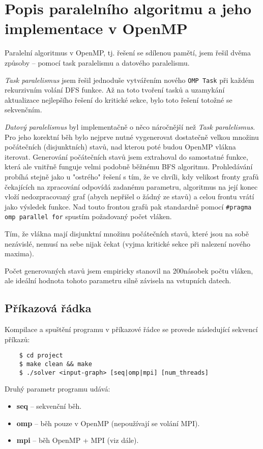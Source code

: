 \documentclass[czech]{article}
\begin{document}
\section{Popis paralelního algoritmu a jeho implementace v OpenMP}

Paralelní algoritmus v OpenMP, tj. řešení se sdílenou pamětí, jsem řešil dvěma způsoby -- pomocí task paralelismu a datového paralelismu.

\textit{Task paralelismus} jsem řešil jednoduše vytvářením nového \texttt{OMP Task} při každém rekurzivním volání DFS funkce. Až na toto tvoření tasků a uzamykání aktualizace nejlepšího řešení do kritické sekce, bylo toto řešení totožné se sekvenčním.

\textit{Datový paralelismus} byl implementačně o něco náročnější než \textit{Task paralelismus}. Pro jeho korektní běh bylo nejprve nutné vygenerovat dostatečně velkou množinu počátečních (disjunktních) stavů, nad kterou poté budou OpenMP vlákna iterovat. Generování počátečních stavů jsem extrahoval do samostatné funkce, která ale vnitřně funguje velmi podobně běžnému BFS algoritmu. Prohledávání probíhá stejně jako u "ostrého" řešení s tím, že ve chvíli, kdy velikost fronty grafů čekajících na zpracování odpovídá zadanému parametru, algoritmus na její konec vloží nedozpracovaný graf (abych nepřišel o žádný ze stavů) a celou frontu vrátí jako výsledek funkce. Nad touto frontou grafů pak standardně pomocí \texttt{\#pragma omp parallel for} spustím požadovaný počet vláken.

Tím, že vlákna mají disjunktní množinu počátečních stavů, které jsou na sobě nezávislé, nemusí na sebe nijak čekat (vyjma kritické sekce při nalezení nového maxima).

Počet generovaných stavů jsem empiricky stanovil na 200násobek počtu vláken, ale ideální hodnota tohoto parametru silně závisela na vstupních datech.

\subsection{Příkazová řádka}
Kompilace a spuštění programu v příkazové řádce se provede následující sekvencí příkazů:
\begin{verbatim}
	$ cd project
	$ make clean && make
	$ ./solver <input-graph> [seq|omp|mpi] [num_threads]
\end{verbatim}

\noindent Druhý parametr programu udává:
\begin{itemize}
	\item \textbf{seq} -- sekvenční běh.
	\item \textbf{omp} -- běh pouze v OpenMP (nepoužívají se volání MPI).
	\item \textbf{mpi} -- běh OpenMP + MPI (viz dále).
\end{itemize}
\end{document}
